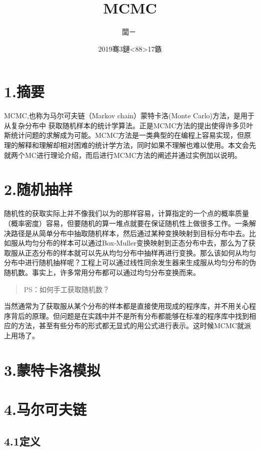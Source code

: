 \documentclass[]{article}
\title{MCMC}
\author{闆ㄧ}
\date{2019骞3鏈\textless{}88\textgreater{}17鏃}
\begin{document}
\maketitle

\section{1.摘要}

MCMC,也称为马尔可夫链（Markov chain）蒙特卡洛(Monte
Carlo)方法，是用于从复杂分布中
获取随机样本的统计学算法。正是MCMC方法的提出使得许多贝叶斯统计问题的求解成为可能。MCMC方法是一类典型的在编程上容易实现，但原理的解释和理解却相对困难的统计学方法，同时如果不理解也难以使用。本文会先就两个MC进行理论介绍，而后进行MCMC方法的阐述并通过实例加以说明。

\section{2.随机抽样}

随机性的获取实际上并不像我们以为的那样容易，计算指定的一个点的概率质量（概率密度）容易，但要随机的算一堆点就要在保证随机性上做很多工作。一条解决路径是从简单分布中抽取随机样本，然后通过某种变换映射到目标分布中去。比如服从均匀分布的样本可以通过Box-Muller变换映射到正态分布中去，那么为了获取服从正态分布的样本就可以先从均匀分布中抽样再进行变换。那么该如何从均匀分布中进行随机抽样呢？工程上可以通过线性同余发生器来生成服从均匀分布的伪随机数。事实上，许多常用分布都可以通过均匀分布变换而来。

\begin{quote}
PS：如何手工获取随机数？
\end{quote}

当然通常为了获取服从某个分布的样本都是直接使用现成的程序库，并不用关心程序背后的原理。但问题是在实践中并不是所有分布都能够在标准的程序库中找到相应的方法，甚至有些分布的形式都无显式的用公式进行表示。这时候MCMC就派上用场了。

\section{3.蒙特卡洛模拟}

\section{4.马尔可夫链}

\subsection{4.1定义}
\end{document}
